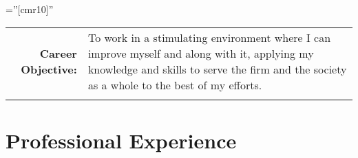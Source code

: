 \documentclass[a4paper,10pt]{article} %
\begin{document}
\pagestyle{empty} %

\font\fb=''[cmr10]'' %


\par{\bigskip\par} %

\begin{tabular}{rp{11cm}}
        \textbf{Career Objective:} & \textsf{To work in a stimulating
        environment where I can improve myself and along with it, applying my knowledge and skills to
        serve the firm and the society as a whole to the best of my efforts.} \\ \\
\end{tabular}


\section{Professional Experience}
\end{document}
